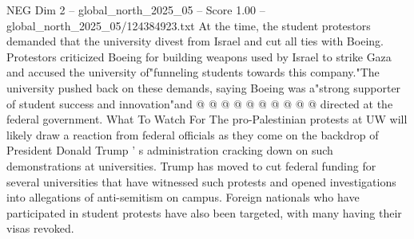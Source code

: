 \begin{textsample}{NEG Dim 2 – global\_north\_2025\_05 – Score 1.00 – global\_north\_2025\_05/124384923.txt}
At the time, the student protestors demanded that the university divest from Israel and cut all ties with Boeing.
Protestors criticized Boeing for building weapons used by Israel to strike Gaza and accused the university of"funneling students towards this company."The university pushed back on these demands, saying Boeing was a"strong supporter of student success and innovation"and @ @ @ @ @ @ @ @ @ @ directed at the federal government.
What To Watch For The pro-Palestinian protests at UW will likely draw a reaction from federal officials as they come on the backdrop of President Donald Trump ' s administration cracking down on such demonstrations at universities.
Trump has moved to cut federal funding for several universities that have witnessed such protests and opened investigations into allegations of anti-semitism on campus.
Foreign nationals who have participated in student protests have also been targeted, with many having their visas revoked.

\end{textsample}
